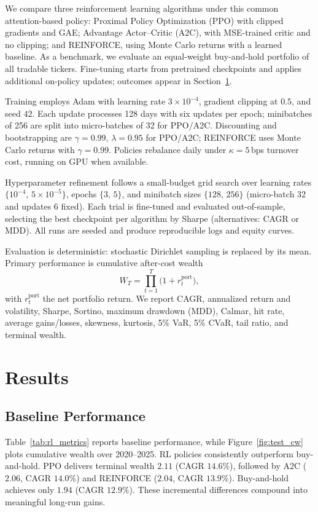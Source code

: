 \documentclass[10pt,leqno]{amsart}
\begin{document}
We compare three reinforcement learning algorithms under this common attention-based policy: Proximal Policy Optimization (PPO) with clipped gradients and GAE; Advantage Actor–Critic (A2C), with MSE-trained critic and no clipping; and REINFORCE, using Monte Carlo returns with a learned baseline. As a benchmark, we evaluate an equal-weight buy-and-hold portfolio of all tradable tickers. Fine-tuning starts from pretrained checkpoints and applies additional on-policy updates; outcomes appear in Section~\ref{sec:results}.

Training employs Adam with learning rate $3\times10^{-4}$, gradient clipping at $0.5$, and seed $42$. Each update processes 128 days with six updates per epoch; minibatches of 256 are split into micro-batches of 32 for PPO/A2C. Discounting and bootstrapping are $\gamma=0.99$, $\lambda=0.95$ for PPO/A2C; REINFORCE uses Monte Carlo returns with $\gamma=0.99$. Policies rebalance daily under $\kappa=5$\,bps turnover cost, running on GPU when available.

Hyperparameter refinement follows a small-budget grid search over learning rates $\{10^{-4},\,5\!\times\!10^{-5}\}$, epochs $\{3,\,5\}$, and minibatch sizes $\{128,\,256\}$ (micro-batch 32 and updates 6 fixed). Each trial is fine-tuned and evaluated out-of-sample, selecting the best checkpoint per algorithm by Sharpe (alternatives: CAGR or MDD). All runs are seeded and produce reproducible logs and equity curves.

Evaluation is deterministic: stochastic Dirichlet sampling is replaced by its mean. Primary performance is cumulative after-cost wealth
\[
W_T = \prod_{t=1}^T \bigl(1 + r^{\text{port}}_t\bigr),
\]
with $r^{\text{port}}_t$ the net portfolio return. We report CAGR, annualized return and volatility, Sharpe, Sortino, maximum drawdown (MDD), Calmar, hit rate, average gains/losses, skewness, kurtosis, 5\% VaR, 5\% CVaR, tail ratio, and terminal wealth.

\section{Results}\label{sec:results}

\subsection{Baseline Performance}
Table~\ref{tab:rl_metrics} reports baseline performance, while Figure~\ref{fig:test_cw} plots cumulative wealth over 2020–2025. RL policies consistently outperform buy-and-hold. PPO delivers terminal wealth $2.11$ (CAGR $14.6\%$), followed by A2C ($2.06$, CAGR $14.0\%$) and REINFORCE ($2.04$, CAGR $13.9\%$). Buy-and-hold achieves only $1.94$ (CAGR $12.9\%$). These incremental differences compound into meaningful long-run gains.
\end{document}
